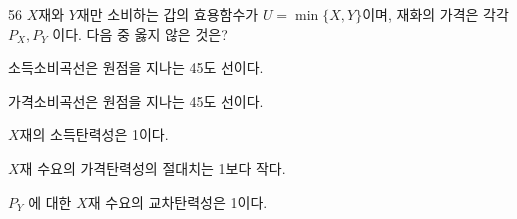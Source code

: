 \begin{question}{56}
$X$재와 $Y$재만 소비하는 갑의 효용함수가 $U=\min\{X,Y\}$이며, 재화의 가격은 각각 $P_{X},P_{Y}$ 이다. 다음 중 옳지 않은 것은?
\begin{choices}
  \item 소득소비곡선은 원점을 지나는 45도 선이다.
  \item 가격소비곡선은 원점을 지나는 45도 선이다.
  \item $X$재의 소득탄력성은 1이다.
  \item $X$재 수요의 가격탄력성의 절대치는 1보다 작다.
  \item $P_{Y}$ 에 대한 $X$재 수요의 교차탄력성은 1이다.
\end{choices}
\end{question}
